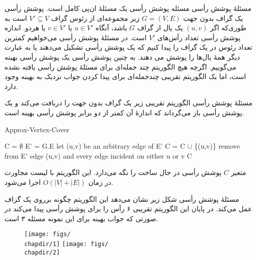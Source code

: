 \begin{itemframe}{‌مسئلهٔ پوشش رأسی}
\itm
مسئله پوشش رأسی
یک مسئلهٔ ان‌پی کامل است.
\itm
پوشش رأسی یک گراف بدون جهت
$G = (V,E)$
زیر مجموعه‌ای از رئوس گراف
$V' \subseteq V$
است به طوری‌که اگر
$(u,v)$
یک یال از گراف
$G$
باشد، آنگاه
$u \in V'$
یا
$v \in V'$
یا هردو. اندازه پوشش رأسی تعداد رأس‌های
$V'$
است.
\itm
در مسئلهٔ پوشش رأسی می‌خواهیم کمترین تعداد رئوس در یک گراف را پیدا کنیم که یک پوشش رأسی تشکیل می‌دهند یا به عبارت دیگر همهٔ یال‌ها را پوشش می دهند. به چنین پوشش رأسی یک پوشش رأسی بهینه
می‌گوییم.
\itm
اگرچه هیچ الگوریتم چند جمله‌ای برای مسئلهٔ پوشش رأسی یافته نشده است، اما یک الگوریتم تقریبی چندجمله‌ای برای پیدا کردن جواب نزدیک به بهینه وجود دارد.
\end{itemframe}

\begin{itemframe}{‌مسئلهٔ پوشش رأسی}
\itm
الگوریتم تقریبی زیر یک گراف بدون جهت را دریافت می‌کند و یک پوشش رأسی باز می‌گرداند که اندازهٔ آن کمتر از دو برابر پوشش رأسی بهینه است.
\begin{algorithm}[H]\alglr
  \caption{Approx-Vertex-Cover}
  \begin{algorithmic}[1]
   \State C = $\emptyset$
   \State E' = G.E
   			\State let (u,v) be an arbitrary edge of E'
   			\State C = C $\cup$ \{(u,v)\}
   			\State remove from E' edge (u,v) and every edge incident on either u or v
   	\EndWhile
   	\State \Return C
  \end{algorithmic}
  \label{alg:merge}
\end{algorithm}
\itm
متغیر
$C$
پوشش رأسی در حال ساخت را نگه می‌دارد. این الگوریتم با لیست مجاورت در زمان
$O(|V|+|E|)$
اجرا می‌شود.
\end{itemframe}

\begin{itemframe}{‌مسئلهٔ پوشش رأسی}
\itm
شکل زیر نشان می‌دهد این الگوریتم چگونه برروی یک گراف عمل می‌کند.
در پایان این الگوریتم تقریبی ۶ رأس را برای پوشش رأسی پیدا می‌کند در صورتی که جواب بهینه برای این نمونه مسئله ۳ است.
\begin{figure}
\texttt{[image: figs/\\chapdir/1]}
\texttt{[image: figs/\\chapdir/2]}
\end{figure}
\end{itemframe}

